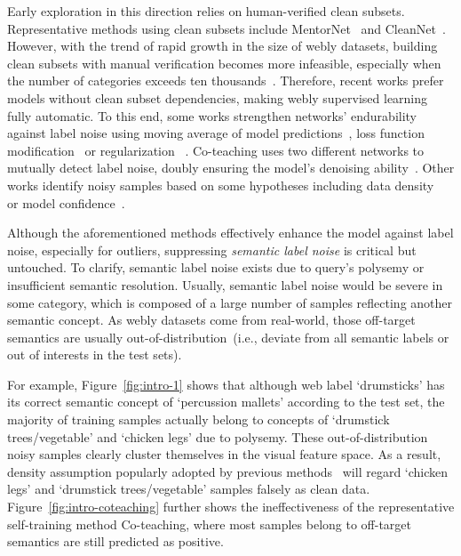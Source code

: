 \documentclass[sigconf]{acmart}
\begin{document}
Early exploration in this direction relies on human-verified clean subsets. Representative methods using clean subsets include MentorNet~\cite{jiang2017mentornet} and CleanNet~\cite{lee2018cleannet}.
However, with the trend of rapid growth in the size of webly datasets, building clean subsets with manual verification becomes more infeasible, especially when the number of categories exceeds ten thousands~\cite{wu2019tencent}.
Therefore, recent works prefer models without clean subset dependencies, making webly supervised learning fully automatic. 
To this end, some works strengthen networks' endurability against label noise using moving average of model predictions~\cite{tanaka2018joint}, 
loss function modification~\cite{manwani2013noise,ghosh2017robust} or
regularization~\cite{zhang2017mixup,miyato2018virtual} .
Co-teaching uses two different networks to mutually detect label noise, doubly ensuring the model's denoising ability~\cite{han2018co}. 
Other works identify noisy samples based on some hypotheses including data density~\cite{guo2018curriculumnet,han2019deep} or model confidence~\cite{yang2020webly}.

Although the aforementioned methods effectively enhance the model against label noise, especially for outliers, suppressing \textit{semantic label noise} is critical but untouched. To clarify, semantic label noise exists due to query's polysemy or insufficient semantic resolution. Usually, semantic label noise would be severe in some category, which is composed of a large number of samples reflecting another  semantic concept.
As webly datasets come from real-world, those off-target semantics are usually out-of-distribution~(i.e., deviate from all semantic labels or out of interests in the test sets).

For example, Figure~\ref{fig:intro-1} shows that although web label `drumsticks' has its correct semantic concept of `percussion mallets' according to the test set, the majority of training samples actually belong to concepts of `drumstick trees/vegetable' and `chicken legs' due to polysemy. These out-of-distribution noisy samples clearly cluster themselves in the visual feature space. 
As a result, density assumption popularly adopted by previous methods~\cite{guo2018curriculumnet,han2019deep} will regard `chicken legs' and `drumstick trees/vegetable' samples falsely as clean data. Figure~\ref{fig:intro-coteaching} further shows the ineffectiveness of the representative self-training method Co-teaching, where most samples belong to off-target semantics are still predicted as positive.
\end{document}
